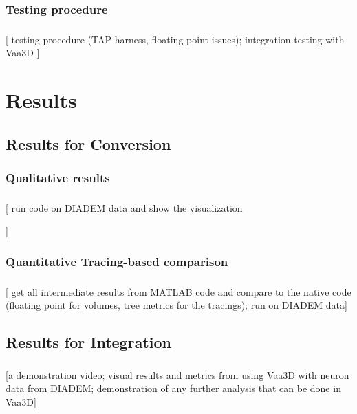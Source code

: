 \documentclass{beamer}
\newcommand{\tmetrics}[1]{#1}
\newcommand{\tmetrics}[1]{\textcolor{tmetrics}{#1}}
\begin{document}
\subsubsection{Testing procedure}
\begin{frame}\frametitle{\subsubsecname}
	[
		testing procedure (TAP harness, floating point
		issues); integration testing with Vaa3D
	]
\end{frame}

\section{Results}

\subsection{Results for Conversion}

\subsubsection{Qualitative results}
\begin{frame}\frametitle{\subsecname}
	[
		\tmetrics{%
			run code on DIADEM data and show the
			visualization
		}
	]
\end{frame}

\subsubsection{Quantitative Tracing-based comparison}
\begin{frame}\frametitle{\subsecname}
	[ get all intermediate results from MATLAB code and
	compare to the native code (floating point for volumes,
	tree metrics for the tracings); run on DIADEM data]
\end{frame}

\subsection{Results for Integration}
\begin{frame}\frametitle{\subsecname}
	[\tmetrics{a demonstration video; visual results and metrics from using
			Vaa3D with neuron data from DIADEM; demonstration of any further analysis
	that can be done in Vaa3D}]

\end{frame}
\end{document}
